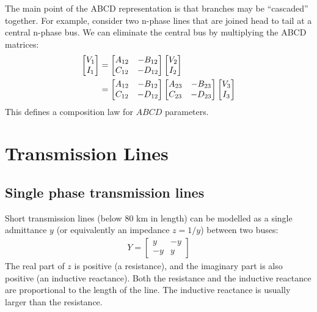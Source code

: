 \documentclass[11pt]{article}
\begin{document}
The main point of the ABCD representation is that branches may be ``cascaded'' together. For example, consider two n-phase lines that are joined head to tail at a central n-phase bus. We can eliminate the central bus by multiplying the ABCD matrices:
\begin{align}
	\begin{bmatrix}
		V_1 \\ I_1
	\end{bmatrix} &=
	\begin{bmatrix}
		A_{12} & -B_{12} \\ C_{12} & -D_{12}
	\end{bmatrix}
	\begin{bmatrix}
		V_2 \\ I_2
	\end{bmatrix} \notag \\
	&=
	\begin{bmatrix}
		A_{12} & -B_{12} \\ C_{12} & -D_{12}
	\end{bmatrix}
	\begin{bmatrix}
		A_{23} & -B_{23} \\ C_{23} & -D_{23}
	\end{bmatrix}
	\begin{bmatrix}
		V_3 \\ I_3
	\end{bmatrix}
\end{align}
This defines a composition law for $ABCD$ parameters.
\section{Transmission Lines}
\subsection{Single phase transmission lines}
Short transmission lines (below 80 km in length) can be modelled as a single admittance $y$ (or equivalently an impedance $z = 1/y$) between two buses:
\begin{align}
	Y = \begin{bmatrix}
		y & -y \\ -y & y
	\end{bmatrix}
\end{align}
The real part of $z$ is positive (a resistance), and the imaginary part is also positive (an inductive reactance). Both the resistance and the inductive reactance are proportional to the length of the line. The inductive reactance is usually larger than the resistance.
\end{document}
